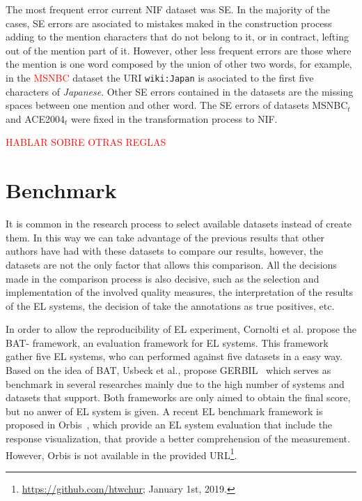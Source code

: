 \documentclass{llncs}
\begin{document}
The most frequent error current NIF dataset was SE. In the majority of the cases, SE errors are asociated to mistakes maked in the construction process adding to the mention characters that do not belong to it, or in contract, lefting out of the mention part of it. However, other less frequent errors are those where the mention is one word composed by the union of other two words, for example, in the \textcolor{red}{MSNBC} dataset the URI \texttt{wiki:Japan} is asociated to the first five characters of \textit{Japanese}. Other SE errors contained in the datasets are the missing spaces between one mention and other word. The SE errors of datasets MSNBC$_t$ and ACE2004$_t$ were fixed in the transformation process to NIF. 

\textcolor{red}{HABLAR SOBRE OTRAS REGLAS}

\section{Benchmark}

It is common in the research process to select available datasets instead of create them. In this way we can take advantage of the previous results that other authors have had with these datasets to compare our results, however, the datasets are not the only factor that allows this comparison. All the decisions made in the comparison process is also decisive, such as the selection and implementation of the involved quality measures, the interpretation of the results of the EL systems, the decision of take the annotations as true positives, etc.

In order to allow the reproducibility of EL experiment, Cornolti et al.\cite{BAT2013} propose the BAT- framework, an evaluation framework for EL systems.  This framework gather five EL systems, who can performed against five datasets in a easy way. Based on the idea of BAT, Usbeck et al., propose GERBIL~\cite{gerbil-2015} which serves as benchmark in several researches mainly due to the high number of systems and datasets that support. Both frameworks are only aimed to obtain the final score, but no anwer of EL system is given. A recent EL benchmark framework is proposed in Orbis~\cite{Orbis2018}, which provide an EL system evaluation that include the response visualization, that provide a better comprehension of the measurement. However, Orbis is not available in the provided URL\footnote{\url{https://github.com/htwchur}; January 1st, 2019.}. 
\end{document}
